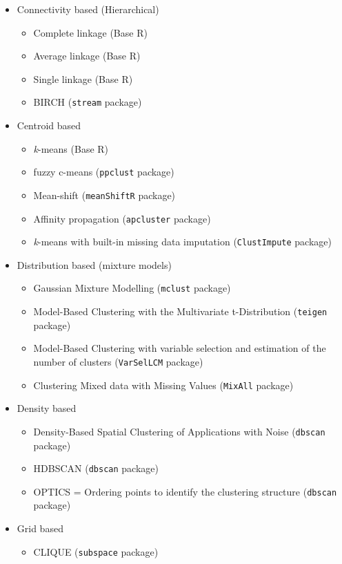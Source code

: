 \documentclass[11pt, a4paper]{article}
\begin{document}
\begin{itemize}
\item Connectivity based (Hierarchical)
\begin{itemize}
	\item Complete linkage (Base R)
	\item Average linkage (Base R)
	\item Single linkage (Base R)
	\item BIRCH (\texttt{stream} package)
\end{itemize}
\item Centroid based
\begin{itemize}
	\item \textit{k}-means (Base R)
	\item fuzzy c-means (\texttt{ppclust} package)
   	\item Mean-shift (\texttt{meanShiftR} package)
   	\item Affinity propagation (\texttt{apcluster} package)
   	\item \textit{k}-means with built-in missing data imputation (\texttt{ClustImpute} package)

\end{itemize}
\item Distribution based (mixture models)
\begin{itemize}
	\item Gaussian Mixture Modelling (\texttt{mclust} package)
   	\item Model-Based Clustering with the Multivariate t-Distribution (\texttt{teigen} package) 
   	\item Model-Based Clustering with variable selection and estimation of the number of clusters (\texttt{VarSelLCM} package)
	\item Clustering Mixed data with Missing Values (\texttt{MixAll} package)
\end{itemize}
\item Density based
\begin{itemize}
	\item Density-Based Spatial Clustering of Applications with Noise (\texttt{dbscan} package)
	\item HDBSCAN (\texttt{dbscan} package)
	\item OPTICS = Ordering points to identify the clustering structure (\texttt{dbscan} package)
\end{itemize}
\item Grid based
\begin{itemize}
	\item CLIQUE (\texttt{subspace} package)
\end{itemize}
\end{itemize}
\end{document}
